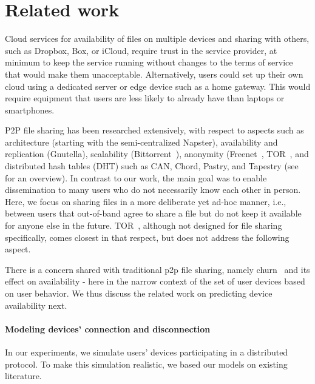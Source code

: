 \section{Related work}%
\label{RelatedWork}



Cloud services for availability of files on multiple devices and sharing with others, such as Dropbox, Box, or iCloud, require trust in the service provider, at minimum to keep the service running without changes to the terms of service that would make them unacceptable. Alternatively, users could set up their own cloud using a dedicated server or edge device such as a home gateway. This would require equipment that users are less likely to already have than laptops or smartphones. 

P2P file sharing has been researched extensively, with respect to aspects such as architecture (starting with the semi-centralized Napster), availability and replication (Gnutella), scalability (Bittorrent~\cite{bittorrent}), anonymity (Freenet~\cite{freenet}, TOR~\cite{Tor}, and distributed hash tables (DHT) such as CAN, Chord, Pastry, and Tapestry (see \cite{dhtchurn} for an overview). In contrast to our work, the main goal was to enable dissemination to many users who do not necessarily know each other in person. Here, we focus on sharing files in a more deliberate yet ad-hoc manner, i.e., between users that out-of-band agree to share a file but do not keep it available for anyone else in the future. TOR~\cite{Tor}, although not designed for file sharing specifically, comes closest in that respect, but does not address the following aspect.

There is a concern shared with traditional p2p file sharing, namely churn~\cite{dhtchurn} and its effect on availability - here in the narrow context of the set of user devices based on user behavior. We thus discuss the related work on predicting device availability next.

\paragraph*{Modeling devices' connection and disconnection} 

In our experiments, we simulate users' devices participating in a distributed protocol.
To make this simulation realistic, we based our models on existing literature. 

